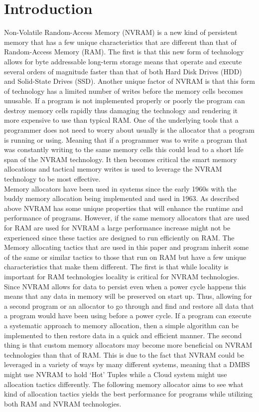\documentclass[conference]{IEEEtran}
\begin{document}
\section{Introduction}
Non-Volatile Random-Access Memory (NVRAM) is a new kind of persistent memory that has a few unique characteristics that are different than that of Random-Access Memory (RAM).  The first is that this new form of technology allows for byte addressable long-term storage means that operate and execute several orders of magnitude faster than that of both Hard Disk Drives (HDD) and Solid-State Drives (SSD). Another unique factor of NVRAM is that this form of technology has a limited number of writes before the memory cells becomes unusable. If a program is not implemented properly or poorly the program can destroy memory cells rapidly thus damaging the technology and rendering it more expensive to use than typical RAM. One of the underlying tools that a programmer does not need to worry about usually is the allocator that a program is running or using.  Meaning that if a programmer was to write a program that was constantly writing to the same memory cells this could lead to a short life span of the NVRAM technology. It then becomes critical the smart memory allocations and tactical memory writes is used to leverage the NVRAM technology to be most effective. 
\\
Memory allocators have been used in systems since the early 1960s with the buddy memory allocation being implemented and used in 1963. As described above NVRAM has some unique properties that will enhance the runtime and performance of programs. However, if the same memory allocators that are used for RAM are used for NVRAM a large performance increase might not be experienced since these tactics are designed to run efficiently on RAM. The Memory allocating tactics that are used in this paper and program inherit some of the same or similar tactics to those that run on RAM but have a few unique characteristics that make them different. The first is that while locality is important for RAM technologies locality is critical for NVRAM technologies. Since NVRAM allows for data to persist even when a power cycle happens this means that any data in memory will be preserved on start up. Thus, allowing for a second program or an allocator to go through and find and restore all data that a program would have been using before a power cycle.  If a program can execute a systematic approach to memory allocation, then a simple algorithm can be implemented to then restore data in a quick and efficient manner. The second thing is that custom memory allocators may become more beneficial on NVRAM technologies than that of RAM. This is due to the fact that NVRAM could be leveraged in a variety of ways by many different systems, meaning that a DMBS might use NVRAM to hold ‘Hot’ Tuples while a Cloud system might use allocation tactics differently.  The following memory allocator aims to see what kind of allocation tactics yields the best performance for programs while utilizing both RAM and NVRAM technologies. 
\end{document}
